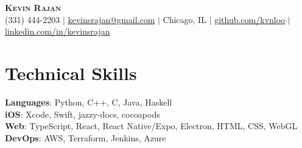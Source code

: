 \documentclass[letterpaper,11pt]{article}
\begin{document}
\begin{center}
    \textbf{\Huge \scshape Kevin Rajan} \\ \vspace{1pt}
    \small (331) 444-2203 $|$
    \href{mailto:kevinsrajan@gmail.com}{\underline{kevinsrajan@gmail.com}} $|$
    Chicago, IL $|$
    \href{https://github.com/kvnloo}{\underline{github.com/kvnloo}} $|$
    \href{https://linkedin.com/in/kevinsrajan}{\underline{linkedin.com/in/kevinsrajan}}
\end{center}

\section{Technical Skills}
 \begin{itemize}[leftmargin=0.15in, label={}]
    \small{\item{
     \textbf{Languages}{: Python, C++, C, Java, Haskell} \\
     \textbf{iOS}{: Xcode, Swift, jazzy-docs, cocoapods} \\
     \textbf{Web}{: TypeScript, React, React Native/Expo, Electron, HTML, CSS, WebGL} \\
     \textbf{DevOps}{: AWS, Terraform, Jenkins, Azure}
    }}
 \end{itemize}
\end{document}
